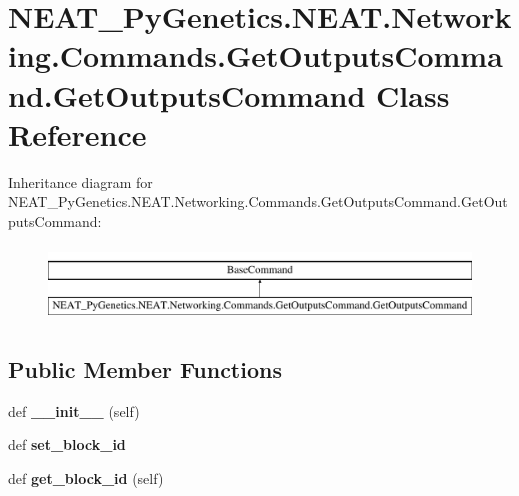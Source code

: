 \hypertarget{class_n_e_a_t___py_genetics_1_1_n_e_a_t_1_1_networking_1_1_commands_1_1_get_outputs_command_1_1_get_outputs_command}{}\section{N\+E\+A\+T\+\_\+\+Py\+Genetics.\+N\+E\+A\+T.\+Networking.\+Commands.\+Get\+Outputs\+Command.\+Get\+Outputs\+Command Class Reference}
\label{class_n_e_a_t___py_genetics_1_1_n_e_a_t_1_1_networking_1_1_commands_1_1_get_outputs_command_1_1_get_outputs_command}
Inheritance diagram for N\+E\+A\+T\+\_\+\+Py\+Genetics.\+N\+E\+A\+T.\+Networking.\+Commands.\+Get\+Outputs\+Command.\+Get\+Outputs\+Command\+:\begin{figure}[H]
\begin{center}
\leavevmode
\includegraphics[height=2.000000cm]{class_n_e_a_t___py_genetics_1_1_n_e_a_t_1_1_networking_1_1_commands_1_1_get_outputs_command_1_1_get_outputs_command}
\end{center}
\end{figure}
\subsection*{Public Member Functions}
\begin{DoxyCompactItemize}
\item 
def {\bfseries \+\_\+\+\_\+init\+\_\+\+\_\+} (self)\hypertarget{class_n_e_a_t___py_genetics_1_1_n_e_a_t_1_1_networking_1_1_commands_1_1_get_outputs_command_1_1_get_outputs_command_a9cb7b34e60b60ab5b71843ba223ff626}{}\label{class_n_e_a_t___py_genetics_1_1_n_e_a_t_1_1_networking_1_1_commands_1_1_get_outputs_command_1_1_get_outputs_command_a9cb7b34e60b60ab5b71843ba223ff626}

\item 
def {\bfseries set\+\_\+block\+\_\+id}\hypertarget{class_n_e_a_t___py_genetics_1_1_n_e_a_t_1_1_networking_1_1_commands_1_1_get_outputs_command_1_1_get_outputs_command_a8ec7f2dc4780ec36b72c7fbff9492621}{}\label{class_n_e_a_t___py_genetics_1_1_n_e_a_t_1_1_networking_1_1_commands_1_1_get_outputs_command_1_1_get_outputs_command_a8ec7f2dc4780ec36b72c7fbff9492621}

\item 
def {\bfseries get\+\_\+block\+\_\+id} (self)\hypertarget{class_n_e_a_t___py_genetics_1_1_n_e_a_t_1_1_networking_1_1_commands_1_1_get_outputs_command_1_1_get_outputs_command_af1c805c74a7c01ff8314f84f8461f25c}{}\label{class_n_e_a_t___py_genetics_1_1_n_e_a_t_1_1_networking_1_1_commands_1_1_get_outputs_command_1_1_get_outputs_command_af1c805c74a7c01ff8314f84f8461f25c}

\end{DoxyCompactItemize}


